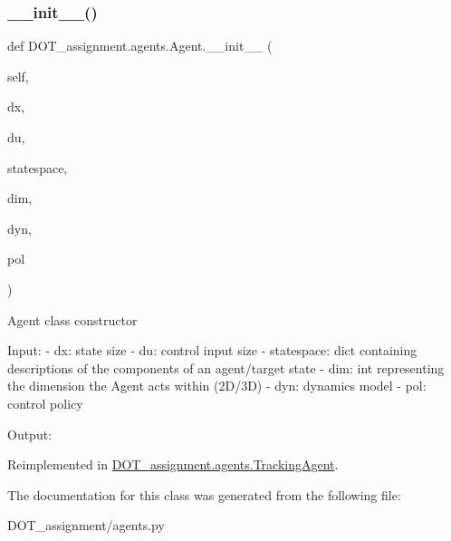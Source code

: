 \subsubsection{\texorpdfstring{\_\_init\_\_()}{\_\_init\_\_()}}
{\footnotesize\ttfamily def D\+O\+T\+\_\+assignment.\+agents.\+Agent.\+\_\+\+\_\+init\+\_\+\+\_\+ (\begin{DoxyParamCaption}\item[{}]{self,  }\item[{}]{dx,  }\item[{}]{du,  }\item[{}]{statespace,  }\item[{}]{dim,  }\item[{}]{dyn,  }\item[{}]{pol }\end{DoxyParamCaption})}

\begin{DoxyVerb}Agent class constructor

Input:
- dx:                   state size
- du:                   control input size
- statespace:           dict containing descriptions of the components of an agent/target state
- dim:                  int representing the dimension the Agent acts within (2D/3D)
- dyn:                  dynamics model
- pol:                  control policy

Output:\end{DoxyVerb}
 

Reimplemented in \mbox{\hyperlink{class_d_o_t__assignment_1_1agents_1_1_tracking_agent_a8176e047211a3a386c4617f35fbf9d88}{D\+O\+T\+\_\+assignment.\+agents.\+Tracking\+Agent}}.



The documentation for this class was generated from the following file\+:\begin{DoxyCompactItemize}
\item 
D\+O\+T\+\_\+assignment/agents.\+py\end{DoxyCompactItemize}
